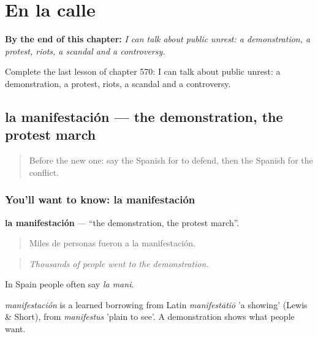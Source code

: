 
\chapter{En la calle}
\label{ch:es-en-la-calle}

\begin{chapteropening}
\textbf{By the end of this chapter:} \emph{I can talk about public unrest: a demonstration, a protest, riots, a scandal and a controversy.}

Complete the last lesson of chapter 570: I can talk about public unrest: a demonstration, a protest, riots, a scandal and a controversy.
\end{chapteropening}

\section[la manifestación]{la manifestación — the demonstration, the protest march}

\label{lesson:ES-C570-manifestacion}



\begin{quote}
Before the new one: say the Spanish for to defend, then the Spanish for the conflict.
\end{quote}

\subsection*{You'll want to know: la manifestación}
\textbf{la manifestación} — \textquotedblleft{}the demonstration, the protest march\textquotedblright{}.

\begin{quote}
Miles de personas fueron a la manifestación.
\end{quote}

\begin{quote}
\emph{Thousands of people went to the demonstration.}
\end{quote}

In Spain people often say \emph{la mani}.

\begin{cousinweb}
\emph{manifestación} is a learned borrowing from Latin \emph{manifestātiō} 'a showing' (Lewis \& Short), from \emph{manifestus} 'plain to see'. A demonstration shows what people want.
\end{cousinweb}

